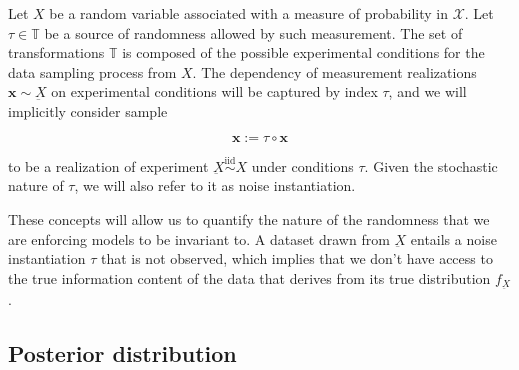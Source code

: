 \begin{definition}[Sample]
    Let $X$ be a random variable associated with a measure of probability
    in $\mathcal{X}$. 
    Let $\tau \in \mathbb{T}$ be a source of randomness allowed
    by such measurement.
    The set of transformations $\mathbb{T}$ is composed
    of the possible experimental conditions for the data sampling 
    process from $X$. The dependency of measurement 
    realizations $\bm{x} \sim \underbar{X}$ on experimental conditions 
    will be captured by index $\tau$, and we will implicitly consider sample
    
    $$
        \bm{x} := \tau \circ \bm{x}
    $$

    to be a realization of experiment $\underbar{X} \overset{\text{iid}}{\sim} X$ under conditions $\tau$. Given the stochastic
    nature of $\tau$, we will also refer to it as noise instantiation.
\end{definition}

These concepts will allow us to quantify the nature of the randomness that we are enforcing
models to be invariant to. A dataset drawn from $\underbar{X}$ entails a 
noise instantiation $\tau$ that is not observed, which implies that we don't have access to the 
true information content of the data that derives from its true distribution $f_{\underbar{X}}$.

\subsection{Posterior distribution}





